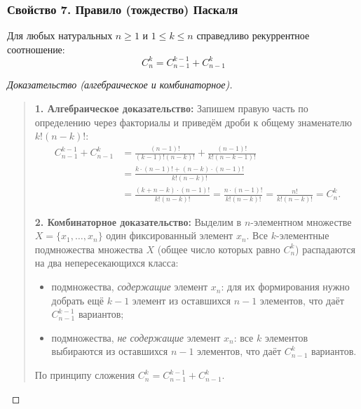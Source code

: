 \subsubsection{Свойство 7. Правило (тождество) Паскаля}

\begin{theorem}
    Для любых натуральных $n \ge 1$ и $1 \le k \le n$ справедливо 
    рекуррентное соотношение:
    \begin{equation} \label{eq:pascal_id}
        C_n^k = C_{n-1}^{k-1} + C_{n-1}^k \tag{9}
    \end{equation}
\end{theorem}

\begin{proof}[Доказательство (алгебраическое и комбинаторное)]~\\
    \begin{quote}
        \textbf{1. Алгебраическое доказательство:} 
        Запишем правую часть по определению через факториалы и приведём 
        дроби к общему знаменателю $k!(n - k)!$:
        \begin{align*}
            C_{n-1}^{k-1} + C_{n-1}^k 
            &= \frac{(n - 1)!}{(k - 1)!(n - k)!} + 
            \frac{(n - 1)!}{k!(n - k - 1)!} \\
            &= \frac{k \cdot (n - 1)! + (n - k) \cdot (n - 1)!}{k!(n - k)!} \\
            &= \frac{(k + n - k) \cdot (n - 1)!}{k!(n - k)!} = 
            \frac{n \cdot (n - 1)!}{k!(n - k)!} = \frac{n!}{k!(n - k)!} = C_n^k.
        \end{align*}

        \textbf{2. Комбинаторное доказательство:} 
        Выделим в $n$-элементном множестве $X = \{x_1, \dots, x_n\}$ 
        один фиксированный элемент $x_n$. Все $k$-элементные подмножества 
        множества $X$ (общее число которых равно $C_n^k$) распадаются на 
        два непересекающихся класса:
        \begin{itemize}
            \item подмножества, \emph{содержащие} элемент $x_n$: для их 
            формирования нужно добрать ещё $k - 1$ элемент из оставшихся 
            $n - 1$ элементов, что даёт $C_{n-1}^{k-1}$ вариантов;
            \item подмножества, \emph{не содержащие} элемент $x_n$: все $k$ 
            элементов выбираются из оставшихся $n - 1$ элементов, что даёт 
            $C_{n-1}^k$ вариантов.
        \end{itemize}
        По принципу сложения $C_n^k = C_{n-1}^{k-1} + C_{n-1}^k$.
    \end{quote}
\end{proof}


